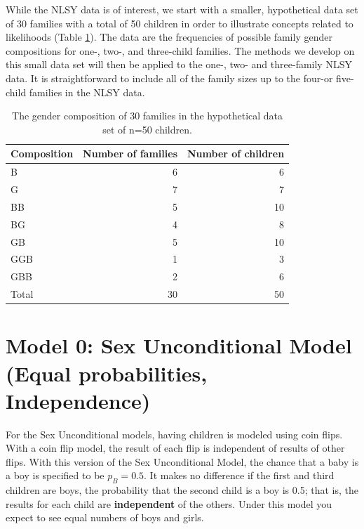 \documentclass[
]{krantz}
\begin{document}
While the NLSY data is of interest, we start with a smaller, hypothetical data set of 30 families with a total of 50 children in order to illustrate concepts related to likelihoods (Table \ref{tab:table1chp2}). The data are the frequencies of possible family gender compositions for one-, two-, and three-child families. The methods we develop on this small data set will then be applied to the one-, two- and three-family NLSY data. It is straightforward to include all of the family sizes up to the four-or five-child families in the NLSY data.

\begin{table}

\caption{\label{tab:table1chp2}The gender composition of 30 families in the hypothetical data set of n=50 children.}
\centering
\begin{tabular}[t]{lrr}
\toprule
Composition & Number of families & Number of children\\
\midrule
B & 6 & 6\\
G & 7 & 7\\
BB & 5 & 10\\
BG & 4 & 8\\
GB & 5 & 10\\
\addlinespace
GGB & 1 & 3\\
GBB & 2 & 6\\
Total & 30 & 50\\
\bottomrule
\end{tabular}
\end{table}

\hypertarget{model-0-sex-unconditional-model-equal-probabilities-independence}{%
\section{Model 0: Sex Unconditional Model (Equal probabilities, Independence)}\label{model-0-sex-unconditional-model-equal-probabilities-independence}}

For the Sex Unconditional models, having children is modeled using coin flips. With a coin flip model, the result of each flip is independent of results of other flips. With this version of the Sex Unconditional Model, the chance that a baby is a boy is specified to be \(p_B=0.5\). It makes no difference if the first and third children are boys, the probability that the second child is a boy is 0.5; that is, the results for each child are \textbf{independent}  of the others. Under this model you expect to see equal numbers of boys and girls.
\end{document}
